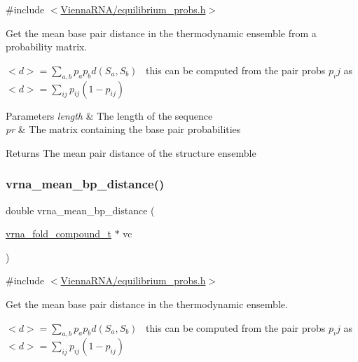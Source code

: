 {\ttfamily \#include $<$\hyperlink{equilibrium__probs_8h}{Vienna\+R\+N\+A/equilibrium\+\_\+probs.\+h}$>$}



Get the mean base pair distance in the thermodynamic ensemble from a probability matrix. 

$<d> = \sum_{a,b} p_a p_b d(S_a,S_b)$~\newline
this can be computed from the pair probs $p_ij$ as~\newline
 $<d> = \sum_{ij} p_{ij}(1-p_{ij})$


\begin{DoxyParams}{Parameters}
{\em length} & The length of the sequence \\
\hline
{\em pr} & The matrix containing the base pair probabilities \\
\hline
\end{DoxyParams}
\begin{DoxyReturn}{Returns}
The mean pair distance of the structure ensemble 
\end{DoxyReturn}
\mbox{\label{group__pf__fold_gaa6b8983b559b9ef4b2e1b31113ea317b}} 
\subsubsection{\texorpdfstring{vrna\+\_\+mean\+\_\+bp\+\_\+distance()}{vrna\_mean\_bp\_distance()}}
{\footnotesize\ttfamily double vrna\+\_\+mean\+\_\+bp\+\_\+distance (\begin{DoxyParamCaption}\item[{\hyperlink{group__fold__compound_ga1b0cef17fd40466cef5968eaeeff6166}{vrna\+\_\+fold\+\_\+compound\+\_\+t} $\ast$}]{vc }\end{DoxyParamCaption})}



{\ttfamily \#include $<$\hyperlink{equilibrium__probs_8h}{Vienna\+R\+N\+A/equilibrium\+\_\+probs.\+h}$>$}



Get the mean base pair distance in the thermodynamic ensemble. 

$<d> = \sum_{a,b} p_a p_b d(S_a,S_b)$~\newline
this can be computed from the pair probs $p_ij$ as~\newline
 $<d> = \sum_{ij} p_{ij}(1-p_{ij})$


